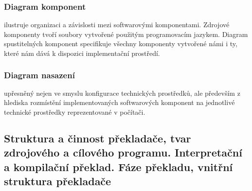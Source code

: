 \documentclass[10pt,a4paper]{article}
\begin{document}
\subsubsection{Diagram komponent}
ilustruje organizaci a závislosti mezi softwarovými komponentami. Zdrojové komponenty tvoří soubory vytvořené použitým programovacím jazykem. Diagram spustitelných komponent specifikuje všechny komponenty vytvořené námi i ty, které nám dává k dispozici implementační prostředí.
\subsubsection{Diagram nasazení}
upřesněný nejen ve smyslu konfigurace technických prostředků, ale především z hlediska rozmístění implementovaných softwarových komponent na jednotlivé technické prostředky reprezentované v počítači.
\subsection{Struktura a činnost překladače, tvar zdrojového a cílového programu. Interpretační a kompilační překlad. Fáze překladu, vnitřní struktura překladače}
\end{document}
